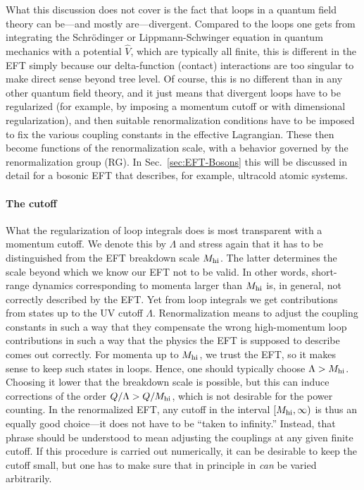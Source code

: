 What this discussion does not cover is the fact that loops in a quantum field 
theory can be---and mostly are---divergent.  Compared to the loops one gets 
from integrating the Schr\"odinger or Lippmann-Schwinger equation in quantum 
mechanics with a potential $\hat{V}$, which are typically all finite, this is 
different in the EFT simply because our delta-function (contact) interactions 
are too singular to make direct sense beyond tree level.  Of course, this is no 
different than in any other quantum field theory, and it just means that 
divergent loops have to be regularized (for example, by imposing a momentum 
cutoff or with dimensional regularization), and then suitable renormalization 
conditions have to be imposed to fix the various coupling constants in the 
effective Lagrangian.  These then become functions of the renormalization scale, 
with a behavior governed by the renormalization group (RG).  In 
Sec.~\ref{sec:EFT-Bosons} this will be discussed in detail for a bosonic EFT 
that describes, for example, ultracold atomic systems.

\paragraph{The cutoff}

What the regularization of loop integrals does is most transparent with a 
momentum cutoff.  We denote this by $\Lambda$ and stress again that it has to 
be distinguished from the EFT breakdown scale $M_{\rm hi}$.  The latter determines 
the scale beyond which we know our EFT not to be valid.  In other words, 
short-range dynamics corresponding to momenta larger than $M_{\rm hi}$ is, in 
general, not correctly described by the EFT.  Yet from loop integrals we get 
contributions from states up to the UV cutoff $\Lambda$.  Renormalization means 
to adjust the coupling constants in such a way that they compensate the wrong 
high-momentum loop contributions in such a way that the physics the EFT is 
supposed to describe comes out correctly.  For momenta up to $M_{\rm hi}$, we 
trust the EFT, so it makes sense to keep such states in loops.  Hence, one 
should typically choose $\Lambda > M_{\rm hi}$.  Choosing it lower that the 
breakdown scale is possible, but this can induce corrections of the order 
$Q/\Lambda > Q/M_{\rm hi}$, which is not desirable for the power counting.  In the 
renormalized EFT, any cutoff in the interval $[M_{\rm hi},\infty)$ is thus an 
equally good choice---it does not have to be ``taken to infinity.''  Instead, 
that phrase should be understood to mean adjusting the couplings at any given 
finite cutoff.  If this procedure is carried out numerically, it can be 
desirable to keep the cutoff small, but one has to make sure that in principle 
in \emph{can} be varied arbitrarily.

